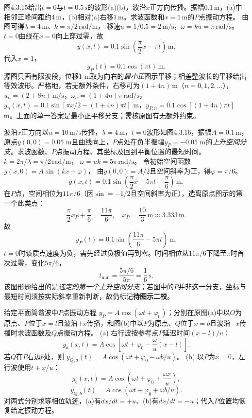 \problemtext 图4.3.15给出$t=0$与$t=0.5\,\mathrm s$的波形(a)(b)，波沿$x$正方向传播。振幅$0.1\,\mathrm m$，(a)中相邻正峰间距约$4\,\mathrm m$，(b)相对(a)右移$1\,\mathrm m$。求波函数和$x=1\,\mathrm m$的$P$点振动方程。
\workings
由图可得$\lambda=4\,\mathrm m$、$k=\pi/2\,\mathrm{rad/m}$，
移速$u=1/0.5=2\,\mathrm{m/s}$，$\omega=ku=\pi\,\mathrm{rad/s}$。
$t=0$曲线在$x=0$向上穿过零，故
\[
\boxed{y(x,t)=0.1\sin\left(\frac\pi2x-\pi t\right)\,\mathrm m}.
\]
代入$x=1$，
\[
\boxed{y_P(t)=0.1\cos(\pi t)\,\mathrm m}.
\]
\crosscheck 源图只画有限波段，位移$1$ m取为向右的\emph{最小正}图示平移；相差整波长的平移给出等效波形。严格地，若无额外条件，右移可为$(1+4n)\,\mathrm m$（$n=0,1,2,\ldots$），$u_n=(2+8n)\,\mathrm{m/s}$，$\omega_n=(1+4n)\pi\,\mathrm{rad/s}$，$y_n(x,t)=0.1\sin[\pi x/2-(1+4n)\pi t]$ m，$y_{P,n}=0.1\cos[(1+4n)\pi t]$ m。上面的单一答案是最小正平移分支；需核原图有无额外约束。

\problemtext 波沿$x$正方向以$u=10\,\mathrm{m/s}$传播，$\lambda=4\,\mathrm m$，$t=0$波形如图4.3.16，振幅$A=0.1\,\mathrm m$，原点$y(0,0)=0.05$ m且曲线向上，$P$点处在负半振幅$y_P=-0.05$ m的\emph{上升空间分支}。求波函数、$P$点振动方程、其坐标及回到平衡位置的最短时间。
\workings
$k=2\pi/\lambda=\pi/2\,\mathrm{rad/m}$，
$\omega=uk=5\pi\,\mathrm{rad/s}$。
令初始空间函数$y(x,0)=A\sin(kx+\varphi)$，
由$y(0,0)=A/2$且空间斜率为正，得$\varphi=\pi/6$。
\[
\boxed{y(x,t)=0.1\sin\left(\frac\pi2x-5\pi t+\frac\pi6\right)\,\mathrm m}.
\]
在$P$点，空间相位为$11\pi/6$（因$\sin=-1/2$且空间斜率为正），选离原点图示的第一个此类点：
\[
\frac\pi2x_P+\frac\pi6=\frac{11\pi}{6},
\quad
\boxed{x_P=\frac{10}{3}\,\mathrm m\approx3.333\,\mathrm m}.
\]
故
\[
\boxed{y_P(t)=0.1\sin\left(\frac{11\pi}{6}-5\pi t\right)\,\mathrm m}.
\]
$t=0$时该质点速度为负，需先经过负极值再到零。时间相位从$11\pi/6$下降至$\pi$时首次过零，变化$5\pi/6$，
\[
\boxed{t_{\min}=\frac{5\pi/6}{5\pi}=\frac16\,\mathrm s}.
\]
\crosscheck 该图形题给出的是\emph{选定的第一个上升空间分支}；若图中的$P$并非这一分支，坐标与最短时间须按实际斜率重新判断，故仍标记\textbf{待图示二校}。

\problemtext 给定平面简谐波中$P$点振动方程
$y_P=A\cos(\omega t+\varphi_0)$；分别在原图(a)中以$O$为原点、$P$位于$x=l$且波沿$+x$传播，和图(b)中以$P$为原点、$Q$位于$x=b$且波沿$-x$传播时求波函数及$Q$点振动方程。
\workings
(a) 右行波按参考点$P$延迟时间$(x-l)/u$：
\[
\boxed{y_a(x,t)=A\cos\left[\omega t+\varphi_0-\frac{\omega}{u}(x-l)\right]}.
\]
若$Q$在$P$右边$b$处，则
$\boxed{y_{Q,a}(t)=A\cos(\omega t+\varphi_0-\omega b/u)}$。
(b) 以$P$为$x=0$，左行波使用$t+x/u$：
\[
\boxed{y_b(x,t)=A\cos\left(\omega t+\varphi_0+\frac{\omega x}{u}\right)},
\]
\[
\boxed{y_{Q,b}(t)=A\cos(\omega t+\varphi_0+\omega b/u)}.
\]
\crosscheck 对两式分别求等相位轨迹，(a)有$dx/dt=+u$、(b)有$dx/dt=-u$；代入$P$位置均恢复给定振动方程。

